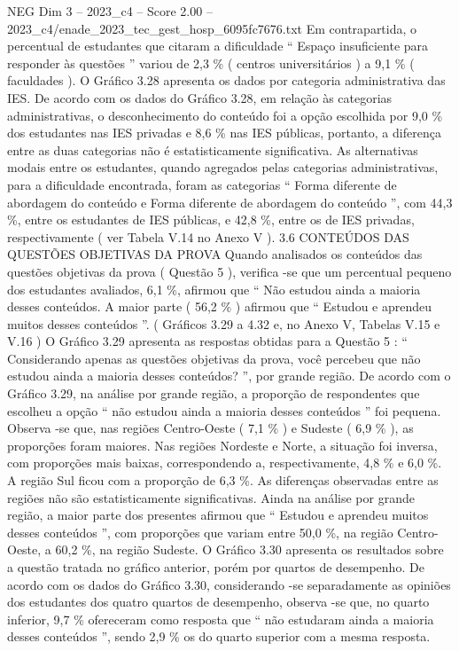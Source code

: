 \begin{textsample}{NEG Dim 3 – 2023\_c4 – Score 2.00 – 2023\_c4/enade\_2023\_tec\_gest\_hosp\_6095fc7676.txt}
Em contrapartida, o percentual de estudantes que citaram a dificuldade “ Espaço insuficiente para responder às questões ” variou de 2,3 \% ( centros universitários ) a 9,1 \% ( faculdades ).
O Gráfico 3.28 apresenta os dados por categoria administrativa das IES.
De acordo com os dados do Gráfico 3.28, em relação às categorias administrativas, o desconhecimento do conteúdo foi a opção escolhida por 9,0 \% dos estudantes nas IES privadas e 8,6 \% nas IES públicas, portanto, a diferença entre as duas categorias não é estatisticamente significativa.
As alternativas modais entre os estudantes, quando agregados pelas categorias administrativas, para a dificuldade encontrada, foram as categorias “ Forma diferente de abordagem do conteúdo e Forma diferente de abordagem do conteúdo ”, com 44,3 \%, entre os estudantes de IES públicas, e 42,8 \%, entre os de IES privadas, respectivamente ( ver Tabela V.14 no Anexo V ). 3.6 CONTEÚDOS DAS QUESTÕES OBJETIVAS DA PROVA Quando analisados os conteúdos das questões objetivas da prova ( Questão 5 ), verifica -se que um percentual pequeno dos estudantes avaliados, 6,1 \%, afirmou que “ Não estudou ainda a maioria desses conteúdos.
A maior parte ( 56,2 \% ) afirmou que “ Estudou e aprendeu muitos desses conteúdos ”. ( Gráficos 3.29 a 4.32 e, no Anexo V, Tabelas V.15 e V.16 ) O Gráfico 3.29 apresenta as respostas obtidas para a Questão 5 : “ Considerando apenas as questões objetivas da prova, você percebeu que não estudou ainda a maioria desses conteúdos? ”, por grande região.
De acordo com o Gráfico 3.29, na análise por grande região, a proporção de respondentes que escolheu a opção “ não estudou ainda a maioria desses conteúdos ” foi pequena.
Observa -se que, nas regiões Centro-Oeste ( 7,1 \% ) e Sudeste ( 6,9 \% ), as proporções foram maiores.
Nas regiões Nordeste e Norte, a situação foi inversa, com proporções mais baixas, correspondendo a, respectivamente, 4,8 \% e 6,0 \%.
A região Sul ficou com a proporção de 6,3 \%.
As diferenças observadas entre as regiões não são estatisticamente significativas.
Ainda na análise por grande região, a maior parte dos presentes afirmou que “ Estudou e aprendeu muitos desses conteúdos ”, com proporções que variam entre 50,0 \%, na região Centro-Oeste, a 60,2 \%, na região Sudeste.
O Gráfico 3.30 apresenta os resultados sobre a questão tratada no gráfico anterior, porém por quartos de desempenho.
De acordo com os dados do Gráfico 3.30, considerando -se separadamente as opiniões dos estudantes dos quatro quartos de desempenho, observa -se que, no quarto inferior, 9,7 \% ofereceram como resposta que “ não estudaram ainda a maioria desses conteúdos ”, sendo 2,9 \% os do quarto superior com a mesma resposta.

\end{textsample}
